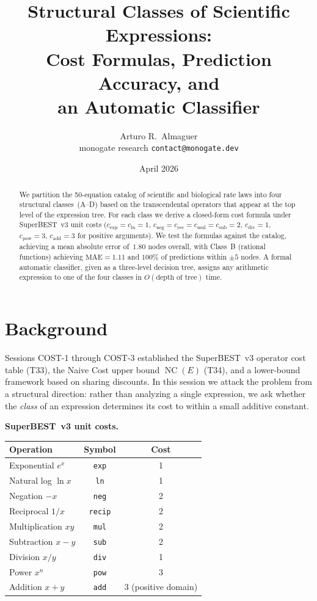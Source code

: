 \documentclass[12pt,a4paper]{article}
\title{Structural Classes of Scientific Expressions:\\
       Cost Formulas, Prediction Accuracy, and\\
       an Automatic Classifier}
\author{Arturo R.\ Almaguer\\
\small monogate research \quad \texttt{contact@monogate.dev}}
\date{April 2026}
\theoremstyle{definition}
\newcommand{\NC}{\operatorname{NC}}
\newcommand{\cexp}{c_{\mathrm{exp}}}
\newcommand{\cln}{c_{\mathrm{ln}}}
\newcommand{\cmul}{c_{\mathrm{mul}}}
\newcommand{\cdiv}{c_{\mathrm{div}}}
\newcommand{\cadd}{c_{\mathrm{add}}}
\newcommand{\csub}{c_{\mathrm{sub}}}
\newcommand{\cpow}{c_{\mathrm{pow}}}
\newcommand{\cneg}{c_{\mathrm{neg}}}
\newcommand{\crec}{c_{\mathrm{rec}}}
\begin{document}
\maketitle

\begin{abstract}
We partition the 50-equation catalog of scientific and biological rate laws into
four structural classes~(A--D) based on the transcendental operators that appear
at the top level of the expression tree.
For each class we derive a closed-form cost formula under SuperBEST~v3 unit
costs ($\cexp=\cln=1$, $\cneg=\crec=\cmul=\csub=2$, $\cdiv=1$, $\cpow=3$,
$\cadd=3$ for positive arguments).
We test the formulas against the catalog, achieving a mean absolute error
of~$1.80$ nodes overall, with Class~B (rational functions) achieving $\mathrm{MAE}=1.11$
and $100\%$ of predictions within $\pm 5$ nodes.
A formal automatic classifier, given as a three-level decision tree, assigns
any arithmetic expression to one of the four classes in $O(\text{depth of tree})$
time.
\end{abstract}

\tableofcontents
\bigskip

\section{Background}
\label{sec:background}

Sessions COST-1 through COST-3 established the SuperBEST~v3 operator cost
table (T33), the Naive Cost upper bound $\NC(E)$ (T34), and a lower-bound
framework based on sharing discounts.
In this session we attack the problem from a structural direction: rather than
analyzing a single expression, we ask whether the \emph{class} of an expression
determines its cost to within a small additive constant.

\medskip
\noindent\textbf{SuperBEST~v3 unit costs.}
\begin{center}
\begin{tabular}{@{}lcc@{}}
\toprule
\textbf{Operation} & \textbf{Symbol} & \textbf{Cost} \\
\midrule
Exponential $e^x$   & \texttt{exp}   & 1 \\
Natural log $\ln x$ & \texttt{ln}    & 1 \\
Negation    $-x$    & \texttt{neg}   & 2 \\
Reciprocal  $1/x$   & \texttt{recip} & 2 \\
Multiplication $xy$ & \texttt{mul}   & 2 \\
Subtraction $x-y$   & \texttt{sub}   & 2 \\
Division    $x/y$   & \texttt{div}   & 1 \\
Power       $x^n$   & \texttt{pow}   & 3 \\
Addition    $x+y$   & \texttt{add}   & 3 (positive domain) \\
\bottomrule
\end{tabular}
\end{center}
\end{document}
